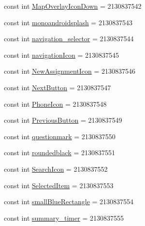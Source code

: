 \begin{DoxyCompactItemize}
\item 
const int \hyperlink{class_field_service_1_1_android_1_1_resource_1_1_drawable_a1450e1851d27e331d120c986dd953843}{Map\+Overlay\+Icon\+Down} = 2130837542
\item 
const int \hyperlink{class_field_service_1_1_android_1_1_resource_1_1_drawable_ac89ea9d3e8c95219fd27db024916fdca}{monoandroidsplash} = 2130837543
\item 
const int \hyperlink{class_field_service_1_1_android_1_1_resource_1_1_drawable_a2d288202e57ee6becaae1cd9ab68f937}{navigation\+\_\+selector} = 2130837544
\item 
const int \hyperlink{class_field_service_1_1_android_1_1_resource_1_1_drawable_ada69aae2edad82df2303dc4c96f24478}{navigation\+Icon} = 2130837545
\item 
const int \hyperlink{class_field_service_1_1_android_1_1_resource_1_1_drawable_a933d2596fdc717abc91556b312774bdb}{New\+Assignment\+Icon} = 2130837546
\item 
const int \hyperlink{class_field_service_1_1_android_1_1_resource_1_1_drawable_a5f0b70c162231a611a57c7d8d31abbe7}{Next\+Button} = 2130837547
\item 
const int \hyperlink{class_field_service_1_1_android_1_1_resource_1_1_drawable_a243d08c7ba185996d03b5ae89b76b13a}{Phone\+Icon} = 2130837548
\item 
const int \hyperlink{class_field_service_1_1_android_1_1_resource_1_1_drawable_af67d03e3f454775b9bc1314992fec4ab}{Previous\+Button} = 2130837549
\item 
const int \hyperlink{class_field_service_1_1_android_1_1_resource_1_1_drawable_abd887eb5e91f98712ffa1706e267f3c7}{questionmark} = 2130837550
\item 
const int \hyperlink{class_field_service_1_1_android_1_1_resource_1_1_drawable_a6d862678ab90d570841ff56cbfd2c499}{roundedblack} = 2130837551
\item 
const int \hyperlink{class_field_service_1_1_android_1_1_resource_1_1_drawable_a9a2d70f778555863a1b5d79f01ffbc10}{Search\+Icon} = 2130837552
\item 
const int \hyperlink{class_field_service_1_1_android_1_1_resource_1_1_drawable_af1647e1da5562b7270192dcc6d7ed5ce}{Selected\+Item} = 2130837553
\item 
const int \hyperlink{class_field_service_1_1_android_1_1_resource_1_1_drawable_a2677a6cda2947ba0ad7d05b35f557955}{small\+Blue\+Rectangle} = 2130837554
\item 
const int \hyperlink{class_field_service_1_1_android_1_1_resource_1_1_drawable_a9311401707b4fa6f0e7e3bfbc5eeed04}{summary\+\_\+timer} = 2130837555

\end{DoxyCompactItemize}
